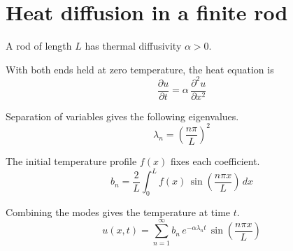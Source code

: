\documentclass{article}
\begin{document}
\section*{Heat diffusion in a finite rod}
A rod of length $L$ has thermal diffusivity $\alpha>0$.

With both ends held at zero temperature, the heat equation is
\begin{equation}
\frac{\partial u}{\partial t}=\alpha\,\frac{\partial^2 u}{\partial x^2}
\end{equation}

Separation of variables gives the following eigenvalues.
\begin{equation}
\lambda_n=\left(\frac{n\pi}{L}\right)^2
\end{equation}

The initial temperature profile $f(x)$ fixes each coefficient.
\begin{equation}
b_n=\frac{2}{L}\int_0^L f(x)\,\sin\!\left(\frac{n\pi x}{L}\right)\,dx
\end{equation}

Combining the modes gives the temperature at time $t$.
\begin{equation}
u(x,t)=\sum_{n=1}^{\infty} b_n\,e^{-\alpha\lambda_n t}\,\sin\!\left(\frac{n\pi x}{L}\right)
\end{equation}
\end{document}
